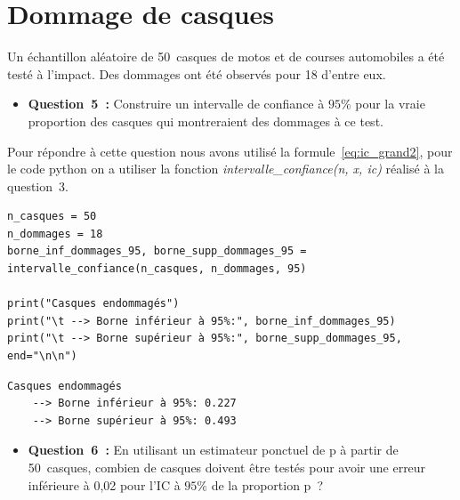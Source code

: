 \section{Dommage de casques}
\vspace{.2cm}

\noindent
Un échantillon aléatoire de 50~casques de motos et de courses automobiles a été testé à l’impact. Des
dommages ont été observés pour 18 d’entre eux. 

\begin{itemize}[label={},itemindent=-2em,leftmargin=2em]
    \item \textbf{Question~5~:} Construire un intervalle de confiance à $95\%$ pour la vraie proportion des casques qui
    montreraient des dommages à ce test.
\end{itemize}
\vspace{.2cm}

\noindent
Pour répondre à cette question nous avons utilisé la formule~\ref*{eq:ic_grand2}, pour le code python on a utiliser la fonction 
\textit{intervalle\_confiance(n, x, ic)} réalisé à la question~3.

\vspace{.2cm}


\begin{lstlisting}[style=myPython, caption=Code Python question 5, frame=lines]
n_casques = 50
n_dommages = 18
borne_inf_dommages_95, borne_supp_dommages_95 = intervalle_confiance(n_casques, n_dommages, 95)

print("Casques endommagés")
print("\t --> Borne inférieur à 95%:", borne_inf_dommages_95)
print("\t --> Borne supérieur à 95%:", borne_supp_dommages_95, end="\n\n")
\end{lstlisting}

\begin{lstlisting}[style=myLog, caption=Résultat du code, frame=lines]
Casques endommagés
    --> Borne inférieur à 95%: 0.227
    --> Borne supérieur à 95%: 0.493
\end{lstlisting}



\vspace{.5cm}


\begin{itemize}[label={},itemindent=-2em,leftmargin=2em]
    \item \textbf{Question~6~:} En utilisant un estimateur ponctuel de p à partir de 50~casques, combien de casques
    doivent être testés pour avoir une erreur inférieure à 0,02 pour l’IC à $95\%$ de la proportion p~?
\end{itemize}
\vspace{.2cm}

